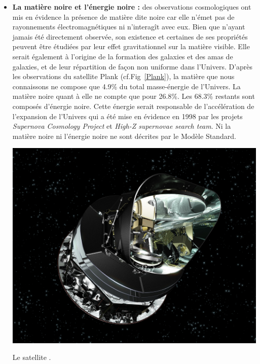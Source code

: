 \begin{itemize}[label=$\bullet$]
\item \textbf{La matière noire et l'énergie noire :} des observations cosmologiques ont mis en évidence la présence de matière dite noire car elle n'émet pas de rayonnements électromagnétiques ni n'interagît avec eux. Bien que n'ayant jamais été directement observée, son existence et certaines de ses propriétés peuvent être étudiées par leur effet gravitationnel sur la matière visible. Elle serait  également à l'origine de la formation des galaxies et des amas de galaxies, et de leur répartition de façon non uniforme dans l'Univers. D'après les observations du satellite Plank (cf.Fig~\ref{Plank}), la matière que nous connaissons ne compose que \num{4.9}\% du total masse-énergie de l'Univers. La matière noire quant à elle ne compte que pour \num{26.8}\%. Les \num{68.3}\% restants sont composés d'énergie noire. Cette énergie serait responsable de l'accélération de l'expansion de l'Univers qui a été mise en évidence en \num{1998} par les projets \textit{Supernova Cosmology Project} et \textit{High-Z supernovae search team}. Ni la matière noire ni l'énergie noire ne sont décrites par le Modèle Standard.
\marginpar
{
\centering
\includegraphics[width=\marginparwidth]{SM/plank.jpg}
\captionsetup{type=figure}\caption{Le satellite .}
\label{Plank}
} 


\end{itemize}
